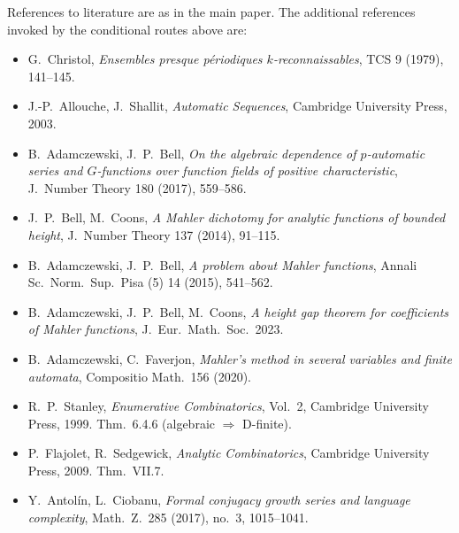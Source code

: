 \documentclass[11pt,a4paper]{article}
\theoremstyle{remark}
\theoremstyle{plain}
\begin{document}
References to literature are as in the main paper.  The additional
references invoked by the conditional routes above are:
\begin{itemize}[leftmargin=2em,itemsep=0.2em]
\item G.~Christol, \emph{Ensembles presque p\'eriodiques
$k$-reconnaissables}, TCS 9 (1979), 141--145.
\item J.-P.~Allouche, J.~Shallit, \emph{Automatic Sequences},
Cambridge University Press, 2003.
\item B.~Adamczewski, J.~P.~Bell, \emph{On the algebraic dependence of
$p$-automatic series and $G$-functions over function fields of
positive characteristic}, J.~Number Theory 180 (2017), 559--586.
\item J.~P.~Bell, M.~Coons, \emph{A Mahler dichotomy for analytic
functions of bounded height}, J.~Number Theory 137 (2014), 91--115.
\item B.~Adamczewski, J.~P.~Bell, \emph{A problem about Mahler
functions}, Annali Sc.~Norm.~Sup.~Pisa (5) 14 (2015), 541--562.
\item B.~Adamczewski, J.~P.~Bell, M.~Coons, \emph{A height gap theorem
for coefficients of Mahler functions}, J.~Eur.~Math.~Soc.\ 2023.
\item B.~Adamczewski, C.~Faverjon, \emph{Mahler's method in several
variables and finite automata}, Compositio Math.\ 156 (2020).
\item R.~P.~Stanley, \emph{Enumerative Combinatorics}, Vol.~2,
Cambridge University Press, 1999.  Thm.~6.4.6 (algebraic $\Rightarrow$
D-finite).
\item P.~Flajolet, R.~Sedgewick, \emph{Analytic Combinatorics},
Cambridge University Press, 2009.  Thm.~VII.7.
\item Y.~Antol\'in, L.~Ciobanu, \emph{Formal conjugacy growth series
and language complexity}, Math.\ Z.\ 285 (2017), no.~3, 1015--1041.
\end{itemize}
\end{document}
